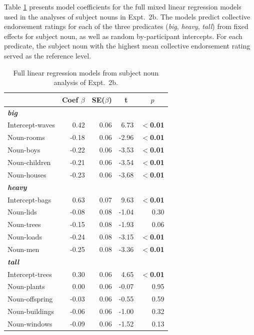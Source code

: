\documentclass[linguex]{sp}
\begin{document}
Table \ref{expt2banalysis} presents model coefficients for the full mixed linear regression models used in the analyses of subject nouns in Expt.~2b. The models predict collective endorsement ratings for each of the three predicates (\emph{big}, \emph{heavy}, \emph{tall}) from fixed effects for subject noun, as well as random by-participant intercepts. For each predicate, the subject noun with the highest mean collective endorsement rating served as the reference level.

\begin{table}[htb] 
	\centering \caption{Full linear regression models from subject noun analysis of Expt.~2b.} \label{expt2banalysis}
\begin{tabular}{lrrrr}\toprule
	&	Coef $\beta$	&	SE($\beta$)	&	\multicolumn{1}{c}{ \textbf{t}}	&	\multicolumn{1}{c}{$p$}\\ \midrule
\emph{\textbf{big}} \\
Intercept-waves& 	0.42 &	0.06	&	6.73	&	\textbf{$<$0.01} \\
Noun-rooms	&	-0.18	&   0.06	&	-2.96&	\textbf{$<$0.01} \\
Noun-boys	&	-0.22&   0.06	&	-3.53	&	\textbf{$<$0.01} \\
Noun-children	&	-0.21	&   0.06	&	-3.54	&	\textbf{$<$0.01} \\
Noun-houses	&	-0.23	&   0.06	&	-3.68	&	\textbf{$<$0.01} \\ \hline
\emph{\textbf{heavy}}\\
Intercept-bags	& 	0.63	&   0.07	&	9.63	&	\textbf{$<$0.01} \\
Noun-lids		&	-0.08	&   0.08	&	-1.04	&	0.30\\
Noun-trees	&	-0.15	&   0.08	&	-1.93	&	0.06 \\
Noun-loads	&	-0.24	&   0.08	&	-3.15	&	\textbf{$<$0.01} \\
Noun-men		&	-0.25	&   0.08	&	-3.36	&	\textbf{$<$0.01} \\ \hline
\emph{\textbf{tall}}\\
Intercept-trees	& 	0.30	&	0.06	&	4.65	&	\textbf{$<$0.01} \\
Noun-plants	&	0.00	&   0.06	&	-0.07	&	0.95 \\
Noun-offspring	&	-0.03	&   0.06	&	-0.55	&	0.59 \\
Noun-buildings	&	-0.06	&   0.06	&	-1.00	&	0.32 \\
Noun-windows	&	-0.09	&   0.06	&	-1.52	&	0.13 \\\hline
\bottomrule
\end{tabular}
\end{table}
\end{document}
